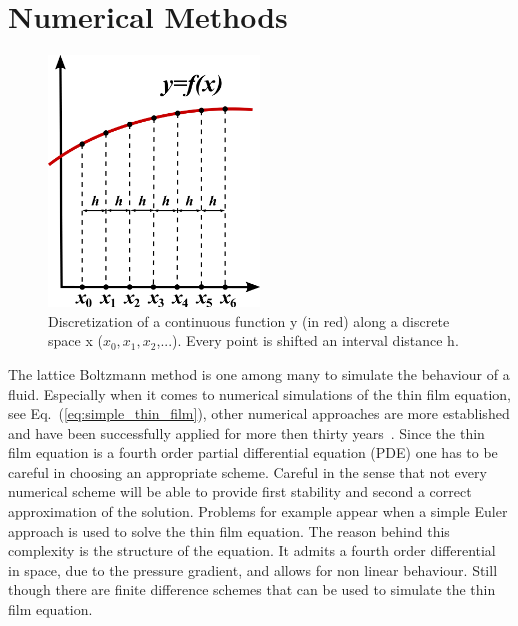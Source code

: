 \section{Numerical Methods}
\label{sec:numerical_methods}
\begin{figure}
    \centering
    \includegraphics[width=0.5\textwidth]{graphics/800px-Finite_Differences.svg.png}
    \caption{Discretization of a continuous function y (in red) along a discrete space x ($x_0, x_1, x_2$,...).
    Every point is shifted an interval distance h.
    }
    \label{fig:finite_difference}
\end{figure}
The lattice Boltzmann method is one among many to simulate the behaviour of a fluid.
Especially when it comes to numerical simulations of the thin film equation, see Eq.~(\ref{eq:simple_thin_film}), other numerical approaches are more established and have been successfully applied for more then thirty years~\cite{beckerComplexDewettingScenarios2003, peschkaSignaturesSlipDewetting2019, davidovitchSpreadingViscousFluid2005, meckeThermalFluctuationsThin2005, diezGlobalModelsMoving2000, schwartzSimulationDropletMotion1998}.
Since the thin film equation is a fourth order partial differential equation (PDE) one has to be careful in choosing an appropriate scheme.
Careful in the sense that not every numerical scheme will be able to provide first stability and second a correct approximation of the solution.
Problems for example appear when a simple Euler approach is used to solve the thin film equation.
The reason behind this complexity is the structure of the equation. 
It admits a fourth order differential in space, due to the pressure gradient, and allows for non linear behaviour.
Still though there are finite difference schemes that can be used to simulate the thin film equation.

